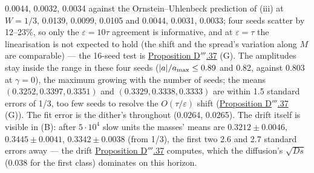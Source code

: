\begin{sloppypar}
0.0044, 0.0032, 0.0034 against the Ornstein--Uhlenbeck prediction of (iii) at $W = 1/3$, 0.0139, 0.0099, 0.0105 and
0.0044, 0.0031, 0.0033; four seeds scatter by 12--23\%, so only the $\varepsilon = 10\tau$ agreement is informative, and
at $\varepsilon = \tau$ the linearisation is not expected to hold (the shift and the spread's variation along $M$ are
comparable) --- the 16-seed test is \hyperref[res:thmDppp:37]{Proposition D$'''$.37} (G). The amplitudes stay inside
the range in these four seeds ($\lvert a\rvert/a_{\max}\le0.89$ and 0.82, against 0.803 at $\gamma = 0$), the maximum growing
with the number of seeds; the means $(0.3252, 0.3397, 0.3351)$ and $(0.3329, 0.3338, 0.3333)$ are within 1.5 standard
errors of 1/3, too few seeds to resolve the $O(\tau/\varepsilon)$ shift (\hyperref[res:thmDppp:37]{Proposition
D$'''$.37} (G)). The fit error is the dither's throughout (0.0264, 0.0265). The drift itself is visible in (B): after
$5\cdot10^4$ slow units the masses' means are $0.3212\pm0.0046$, $0.3445\pm0.0041$, $0.3342\pm0.0038$ (from 1/3), the
first two 2.6 and 2.7 standard errors away --- the drift \hyperref[res:thmDppp:37]{Proposition D$'''$.37} computes,
which the diffusion's $\sqrt{Ds}$ (0.038 for the first class) dominates on this horizon.
\end{sloppypar}


